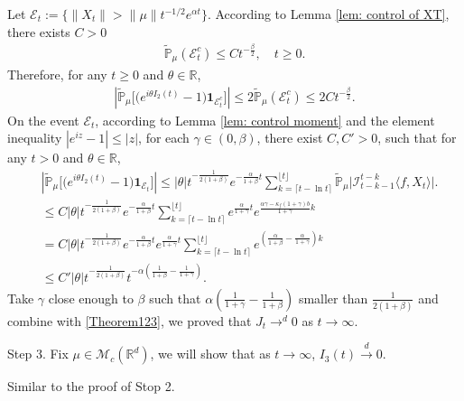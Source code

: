 \documentclass[12pt,oneside,english]{amsart}
\theoremstyle{plain}
\theoremstyle{definition}
\numberwithin{equation}{section}
\begin{document}
Let $\mathcal{E}_t:=\{\|X_t\|>\|\mu\|t^{-1/2}e^{\alpha t}\}$. According to Lemma \ref{lem: control of XT}, there exists $C>0$
\begin{align}
    \mathbb{\tilde{P}}_{\mu}(\mathcal{E}^c_t)\leq C t^{-\frac{\beta}{2}}, \quad t\geq0.
\end{align}
    Therefore, for any $t\geq 0$ and $\theta\in \mathbb{R}$,
    \begin{align}\label{Theorem123}
        \left|\mathbb{\tilde{P}}_{\mu}\big [\big(e^{i\theta I_2(t)}-1\big)\mathbf{1}_{\mathcal{E}^c_t}\big]\right|\leq 2\mathbb{\tilde{P}}_{\mu}(\mathcal{E}^c_t)\leq 2Ct^{-\frac{\beta}{2}}.
    \end{align}
On the event $\mathcal{E}_t$, according to Lemma \ref{lem: control moment} and the element inequality $|e^{i z}-1|\leq |z|$, for each $\gamma\in (0,\beta)$, there exist $C,C'>0$, such that for any $t>0$ and $\theta \in \mathbb{R}$,
\begin{align*}
    &\left|\mathbb{\tilde{P}}_{\mu}\big[\big(e^{i\theta I_2(t)}-1\big)\mathbf{1}_{\mathcal{E}_t}\big]\right|
    \leq|\theta| t^{-\frac{1}{2(1+\beta)}}e^{-\frac{\alpha}{1+\beta}t}\sum_{k=\lceil t-\ln t \rceil}^{\lfloor t \rfloor}\mathbb{\tilde{P}}_{\mu}\big| \mathcal{I}_{t-k-1}^{t-k}\langle f,X_t\rangle\big|.\\
    &\leq C |\theta| t^{-\frac{1}{2(1+\beta)}}e^{-\frac{\alpha}{1+\beta}t}\sum_{k=\lceil t-\ln t \rceil}^{\lfloor t \rfloor}e^{\frac{\alpha}{1+\gamma}t}e^{\frac{\alpha\gamma-\kappa_f(1+\gamma)b}{1+\gamma}k}\\
    &= C |\theta| t^{-\frac{1}{2(1+\beta)}}e^{-\frac{\alpha}{1+\beta}t}e^{\frac{\alpha}{1+\gamma}t}\sum_{k=\lceil t-\ln t \rceil}^{\lfloor t \rfloor}e^{(\frac{\alpha}{1+\beta}-\frac{\alpha}{1+\gamma})k}\\
    &\leq C'|\theta|t^{-\frac{1}{2(1+\beta)}}t^{-\alpha(\frac{1}{1+\beta}-\frac{1}{1+\gamma})}.
\end{align*}
 Take $\gamma$ close enough to $\beta$ such that $\alpha(\frac{1}{1+\gamma}-\frac{1}{1+\beta})$ smaller than $\frac{1}{2(1+\beta)}$ and combine with \eqref{Theorem123}, we proved that $J_t \rightarrow^d 0$ as $t\rightarrow \infty$.

Step 3. Fix $\mu \in \mathcal{M}_c(\mathbb{R}^d)$, we will show that as $t\rightarrow \infty$, $I_3(t) \xrightarrow{d} 0$.

Similar to the proof of Stop 2.
\end{document}
